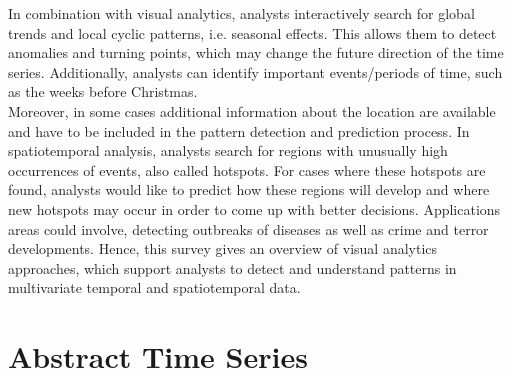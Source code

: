 \documentclass[electronic]{vgtc}             %
\begin{document}
In combination with visual analytics, analysts interactively search for global trends and local cyclic patterns, i.e. seasonal effects.
This allows them to detect anomalies and turning points, which may change the future direction of the time series.
Additionally, analysts can identify important events/periods of time, such as the weeks before Christmas.\\
Moreover, in some cases additional information about the location are available and have to be included in the pattern detection and prediction process. 
In spatiotemporal analysis, analysts search for regions with unusually high occurrences of events, also called hotspots.
For cases where these hotspots are found, analysts would like to predict how these regions will develop and where new hotspots may occur in order to come up with better decisions.
Applications areas could involve, detecting outbreaks of diseases as well as crime and terror developments. 
Hence, this survey gives an overview of visual analytics approaches, which support analysts to detect and understand patterns in multivariate temporal and spatiotemporal data.

\section{Abstract Time Series\label{sec:temporal}}
%
%
\end{document}
